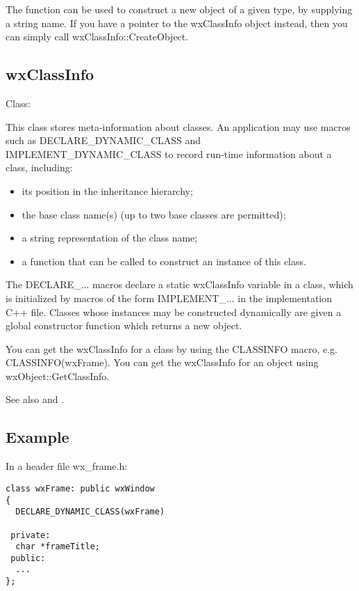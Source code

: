 The function  can be used
to construct a new object of a given type, by supplying a string name.
If you have a pointer to the wxClassInfo object instead, then you
can simply call wxClassInfo::CreateObject.

\subsection{wxClassInfo}\label{wxclassinfooverview}


Class: 

This class stores meta-information about classes. An application
may use macros such as DECLARE\_DYNAMIC\_CLASS and IMPLEMENT\_DYNAMIC\_CLASS
to record run-time information about a class, including:

\begin{itemize}\itemsep=0pt
\item its position in the inheritance hierarchy;
\item the base class name(s) (up to two base classes are permitted);
\item a string representation of the class name;
\item a function that can be called to construct an instance of this class.
\end{itemize}

The DECLARE\_... macros declare a static wxClassInfo variable in a class, which is initialized
by macros of the form IMPLEMENT\_... in the implementation C++ file. Classes whose instances may be
constructed dynamically are given a global constructor function which returns a new object.

You can get the wxClassInfo for a class by using the CLASSINFO macro, e.g. CLASSINFO(wxFrame).
You can get the wxClassInfo for an object using wxObject::GetClassInfo.

See also  and .

\subsection{Example}

In a header file wx\_frame.h:

\begin{verbatim}
class wxFrame: public wxWindow
{
  DECLARE_DYNAMIC_CLASS(wxFrame)

 private:
  char *frameTitle;
 public:
  ...
};
\end{verbatim}

